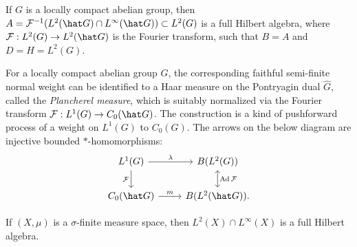 \documentclass{../../../small}
\begin{document}
\begin{ex}
\iffalse
The left involution $S$ is an isometric anti-linear automorphism of $L^1(G)=L^1(G,ds)$, but the right involution $F$ defines an isometric anti-linear isomorphism between $L^1(G,ds)$ and $L^1(G,ds^{-1})$.
To sum up,
\[\begin{array}{lrl}
\xi\in H &\Leftrightarrow& \|\xi\|_2<\infty,\\
\xi\in D &\Leftrightarrow& \|S\xi\|_2+\|\xi\|_2<\infty,\\
\xi\in A &\Rightarrow& \|\lambda(\xi)\|+\|S\xi\|_2+\|\xi\|_2<\infty,\\
\xi\in B' &\Leftrightarrow& \|\rho(\xi)\|+\|\xi\|_2<\infty,\\
\xi\in D' &\Leftrightarrow& \|F\xi\|_2+\|\xi\|_2<\infty,\\
\xi\in A' &\Leftrightarrow& \|\rho(\xi)\|+\|F\xi\|_2+\|\xi\|_2<\infty,\\
\xi\in B &\Leftrightarrow& \|\lambda(\xi)\|+\|\xi\|_2<\infty,\\
\xi\in A'' &\Leftrightarrow& \|\lambda(\xi)\|+\|S\xi\|_2+\|\xi\|_2<\infty.
\end{array}\]
\fi

\end{ex}

\begin{ex}
If $G$ is a locally compact abelian group, then $A=\cF^{-1}(L^2(\hat G)\cap L^\infty(\hat G))\subset L^2(G)$ is a full Hilbert algebra, where $\cF:L^2(G)\to L^2(\hat G)$ is the Fourier transform, such that $B=A$ and $D=H=L^2(G)$.

For a locally compact abelian group $G$, the corresponding faithful semi-finite normal weight can be identified to a Haar measure on the Pontryagin dual $\hat G$, called the \emph{Plancherel measure}, which is suitably normalized via the Fourier transform $\cF:L^1(G)\to C_0(\hat G)$.
The construction is a kind of pushforward process of a weight on $L^1(G)$ to $C_0(G)$.
The arrows on the below diagram are injective bounded $*$-homomorphisms:
\[\begin{tikzcd}
L^1(G) \rar{\lambda}\dar[swap]{\cF} & B(L^2(G)) \dar[<->]{\Ad\cF} \\
C_0(\hat G) \rar{m} & B(L^2(\hat G)).
\end{tikzcd}\]
\end{ex}

\begin{ex}
If $(X,\mu)$ is a $\sigma$-finite measure space, then $L^2(X)\cap L^\infty(X)$ is a full Hilbert algebra.
\end{ex}
\end{document}
